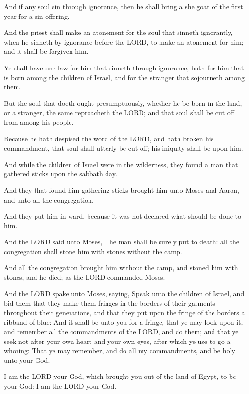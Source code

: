 \Verse And if any soul sin through ignorance, then he shall bring a she
goat of the first year for a sin offering.

\Verse And the priest shall make an atonement for the soul that sinneth
ignorantly, when he sinneth by ignorance before the LORD, to make an
atonement for him; and it shall be forgiven him.

\Verse Ye shall have one law for him that sinneth through ignorance,
both for him that is born among the children of Israel, and for the
stranger that sojourneth among them.

\Verse But the soul that doeth ought presumptuously, whether he be born
in the land, or a stranger, the same reproacheth the LORD; and that
soul shall be cut off from among his people.

\Verse Because he hath despised the word of the LORD, and hath broken
his commandment, that soul shall utterly be cut off; his iniquity
shall be upon him.

\Verse And while the children of Israel were in the wilderness, they
found a man that gathered sticks upon the sabbath day.

\Verse And they that found him gathering sticks brought him unto Moses
and Aaron, and unto all the congregation.

\Verse And they put him in ward, because it was not declared what
should be done to him.

\Verse And the LORD said unto Moses, The man shall be surely put to
death: all the congregation shall stone him with stones without the
camp.

\Verse And all the congregation brought him without the camp, and
stoned him with stones, and he died; as the LORD commanded Moses.

\Verse And the LORD spake unto Moses, saying, \Verse Speak unto the
children of Israel, and bid them that they make them fringes in the
borders of their garments throughout their generations, and that they
put upon the fringe of the borders a ribband of blue: \Verse And it
shall be unto you for a fringe, that ye may look upon it, and remember
all the commandments of the LORD, and do them; and that ye seek not
after your own heart and your own eyes, after which ye use to go a
whoring: \Verse That ye may remember, and do all my commandments, and
be holy unto your God.

\Verse I am the LORD your God, which brought you out of the land of
Egypt, to be your God: I am the LORD your God.


